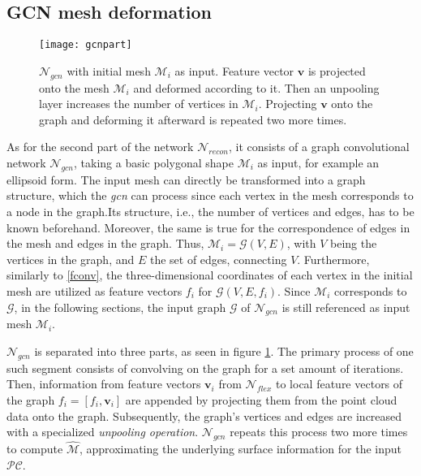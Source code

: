 \subsection{GCN mesh deformation}
   \label{gcnconv}
   \begin{figure}
      \begin{center}
      \texttt{[image: gcnpart]}
      \caption{$\mathcal{N}_{gcn}$ with initial mesh $\mathcal{M}_i$ as input. Feature vector $\textbf{v}$ is
       projected onto the mesh $\mathcal{M}_i$ and deformed according to it. Then an unpooling layer increases
        the number of vertices in $\mathcal{M}_i$. Projecting $\textbf{v}$ onto the graph and deforming it afterward is repeated two more times.}
      \label{fig:gcn}
      \end{center}
   \end{figure}
   As for the second part of the network $\mathcal{N}_{recon}$, it consists 
   of a graph convolutional network $\mathcal{N}_{gcn}$, taking a basic polygonal 
   shape $\mathcal{M}_{i}$ as input, for example an ellipsoid form.
   The input mesh can directly be transformed into a graph structure, which the \emph{gcn}
   can process since each vertex in the mesh corresponds to a node in the graph.Its structure, i.e., 
   the number of vertices and edges, has to be known beforehand.
   Moreover, the same is true for the correspondence of edges in the mesh and edges in the graph. Thus, $\mathcal{M}_{i}=\mathcal{G}(V,E)$,
   with $V$ being the vertices in the graph, and $E$ the set of edges, connecting $V$.
   Furthermore, similarly to \ref{fconv}, the three-dimensional coordinates of each vertex in
   the initial mesh are utilized as feature vectors $f_i$ for $\mathcal{G}(V,E,f_i)$. Since $\mathcal{M}_{i}$ corresponds to $\mathcal{G}$, 
   in the following sections, the input graph $\mathcal{G}$ of $\mathcal{N}_{gcn}$ is still referenced as input mesh $\mathcal{M}_{i}$.
 
   $\mathcal{N}_{gcn}$ is separated into three parts, as seen in figure \ref{fig:gcn}.
   The primary process of one such segment consists of convolving on the graph for a set
   amount of iterations. Then, information from feature vectors $\textbf{v}_i$ from $\mathcal{N}_{flex}$ 
   to local feature vectors of the graph $f_i = [f_i,\textbf{v}_i]$ are appended by projecting them
   from the point cloud data onto the graph. Subsequently, the graph's vertices and edges are increased 
   with a specialized \emph{unpooling operation}. $\mathcal{N}_{gcn}$ repeats this process two more times 
   to compute $\hat{\mathcal{M}}$, approximating the underlying surface information for the input $\mathcal{PC}$.

